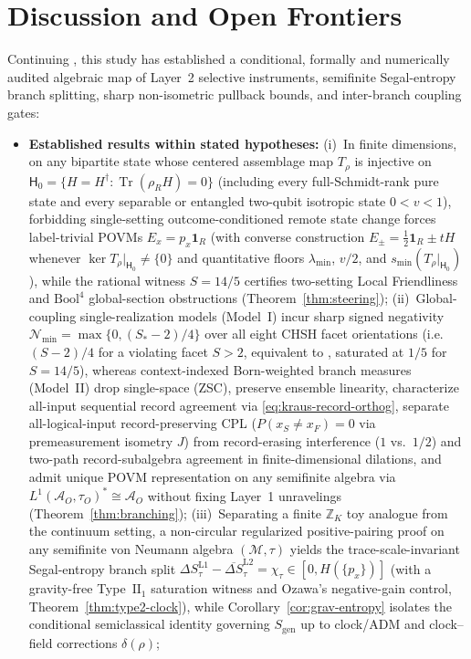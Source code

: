 \documentclass[11pt,a4paper]{article}
\theoremstyle{definition}
\theoremstyle{remark}
\newcommand{\Tr}{\operatorname{Tr}}
\newcommand{\cA}{\mathcal{A}}
\newcommand{\cM}{\mathcal{M}}
\newcommand{\cN}{\mathcal{N}}
\newcommand{\bbZ}{\mathbb{Z}}
\newcommand{\1}{\mathbf{1}}
\begin{document}
\section{Discussion and Open Frontiers}\label{sec:conclusion}

Continuing \cite{Soga2026OSTQD,Soga2026OSTQDSK}, this study has established a conditional, formally and numerically audited algebraic map of Layer~2 selective instruments, semifinite Segal-entropy branch splitting, sharp non-isometric pullback bounds, and inter-branch coupling gates:
\begin{itemize}
  \item \textbf{Established results within stated hypotheses:}
  (i)~In finite dimensions, on any bipartite state whose centered assemblage map $T_\rho$ is injective on $\mathsf{H}_0=\{H=H^\dagger:\Tr(\rho_R H)=0\}$ (including every full-Schmidt-rank pure state and every separable or entangled two-qubit isotropic state $0<v<1$), forbidding single-setting outcome-conditioned remote state change forces label-trivial POVMs $E_x=p_x\1_R$ (with converse construction $E_\pm=\frac{1}{2}\1_R\pm tH$ whenever $\ker T_\rho|_{\mathsf{H}_0}\neq\{0\}$ and quantitative floors $\lambda_{\min}$, $v/2$, and $s_{\min}(T_\rho|_{\mathsf{H}_0})$), while the rational witness $S=14/5$ certifies two-setting Local Friendliness and $\mathrm{Bool}^4$ global-section obstructions (Theorem~\ref{thm:steering});
  (ii)~Global-coupling single-realization models (Model~I) incur sharp signed negativity $\cN_{\min}=\max\{0,(S_*-2)/4\}$ over all eight CHSH facet orientations (i.e.\ $(S-2)/4$ for a violating facet $S>2$, equivalent to \cite{Oas2014}, saturated at $1/5$ for $S=14/5$), whereas context-indexed Born-weighted branch measures (Model~II) drop single-space (ZSC), preserve ensemble linearity, characterize all-input sequential record agreement via \eqref{eq:kraus-record-orthog}, separate all-logical-input record-preserving CPL ($P(x_S\neq x_F)=0$ via premeasurement isometry $J$) from record-erasing interference ($1$ vs.\ $1/2$) and two-path record-subalgebra agreement in finite-dimensional dilations, and admit unique POVM representation on any semifinite algebra via $L^1(\cA_O,\tau_O)^*\cong\cA_O$ without fixing Layer~1 unravelings (Theorem~\ref{thm:branching});
  (iii)~Separating a finite $\bbZ_K$ toy analogue from the continuum setting, a non-circular regularized positive-pairing proof on any semifinite von Neumann algebra $(\cM,\tau)$ yields the trace-scale-invariant Segal-entropy branch split $\Delta S_\tau^{\mathrm{L1}}-\overline{\Delta S}_\tau^{\mathrm{L2}}=\chi_\tau\in[0,H(\{p_x\})]$ (with a gravity-free Type~$\mathrm{II}_1$ saturation witness and Ozawa's negative-gain control, Theorem~\ref{thm:type2-clock}), while Corollary~\ref{cor:grav-entropy} isolates the conditional semiclassical identity governing $S_{\mathrm{gen}}$ up to clock/ADM and clock--field corrections $\delta(\rho)$;

\end{itemize}
\end{document}

